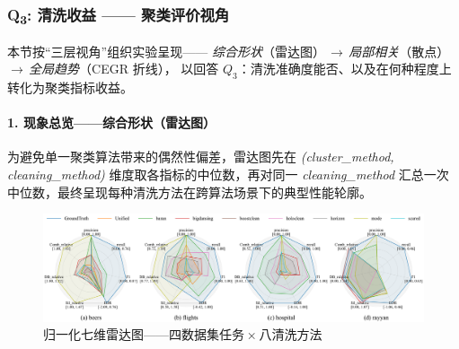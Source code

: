\documentclass[10pt]{article} %
\numberwithin{equation}{section}
\begin{document}
\subsubsection{Q\textsubscript{3}: 清洗收益 —— 聚类评价视角}
\label{sec:q3-metric}
本节按“三层视角”组织实验呈现——  
\emph{综合形状}（雷达图）\,$\rightarrow$\,\emph{局部相关}（散点）%
\,$\rightarrow$\,\emph{全局趋势}（CEGR 折线），  
以回答 \(Q_3\)：清洗准确度能否、以及在何种程度上转化为聚类指标收益。

\paragraph{1. 现象总览——综合形状（雷达图）}
为避免单一聚类算法带来的偶然性偏差，雷达图先在 \textit{(cluster\_method,\,cleaning\_method)} 维度取各指标的中位数，再对同一 \textit{cleaning\_method} 汇总一次中位数，最终呈现每种清洗方法在跨算法场景下的典型性能轮廓。
\vspace{-0.25em}
\begin{figure}[t]
  \centering
  \includegraphics[width=\linewidth]{figures/6.4.3graph/radar_four_in_one.pdf}
  \caption{归一化七维雷达图——四数据集任务 × 八清洗方法}
  \label{fig:radar_four_in_one}
\end{figure}
\end{document}
